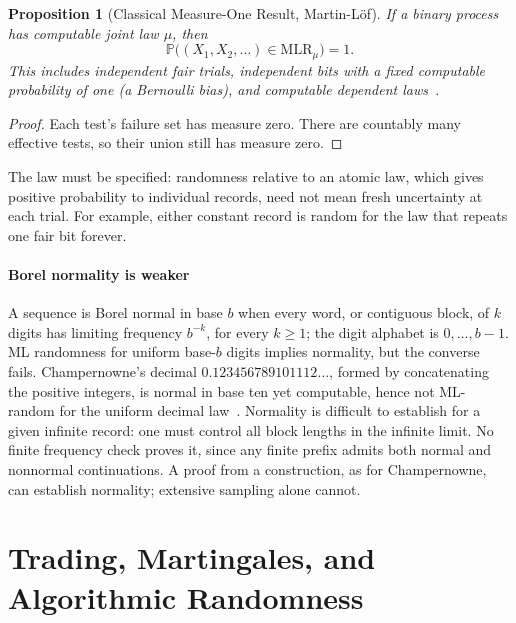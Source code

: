 \documentclass[aps,pra,reprint,superscriptaddress,amsmath,amssymb,floatfix]{revtex4-2}
\theoremstyle{plain}
\newtheorem{proposition}[theorem]{Proposition}
\theoremstyle{definition}
\theoremstyle{remark}
\begin{document}
\begin{proposition}[Classical Measure-One Result, Martin-L\"of]
  \label{prop:process-ml}
  If a binary process has computable joint law \(\mu\), then
  \begin{equation}
    \mathbb P\bigl((X_1,X_2,\ldots)\in\mathrm{MLR}_\mu\bigr)=1.
    \label{eq:process-ml}
  \end{equation}
  This includes independent fair trials, independent bits with a fixed
  computable probability of one (a Bernoulli bias), and computable dependent laws~\cite[Sec.~IV]{MartinLof1966}.
\end{proposition}

\begin{proof}
Each test's failure set has measure zero. There are countably many effective
tests, so their union still has measure zero.
\end{proof}

The law must be specified: randomness relative to an atomic law, which gives
positive probability to individual records, need not mean fresh uncertainty
at each trial. For example, either constant record is random
for the law that repeats one fair bit forever.

\paragraph{Borel normality is weaker}
\label{par:normality}

A sequence is Borel normal in base \(b\) when every word, or contiguous block,
of \(k\) digits has limiting frequency \(b^{-k}\), for every \(k\geq1\);
the digit alphabet is \(0,\ldots,b-1\).
ML randomness for uniform base-\(b\) digits implies normality, but the converse
fails. Champernowne's decimal
\(0.123456789101112\ldots\), formed by concatenating the positive integers,
is normal in base ten yet computable, hence not ML-random for the uniform
decimal law~\cite{ch1}. Normality is difficult to establish for a given
infinite record: one must control all block lengths in the infinite limit.
No finite frequency check proves it, since any finite prefix admits both
normal and nonnormal continuations. A proof from a construction, as for
Champernowne, can establish normality; extensive sampling alone cannot.

\section{Trading, Martingales, and Algorithmic Randomness}
\label{sec:martingales}
\end{document}
